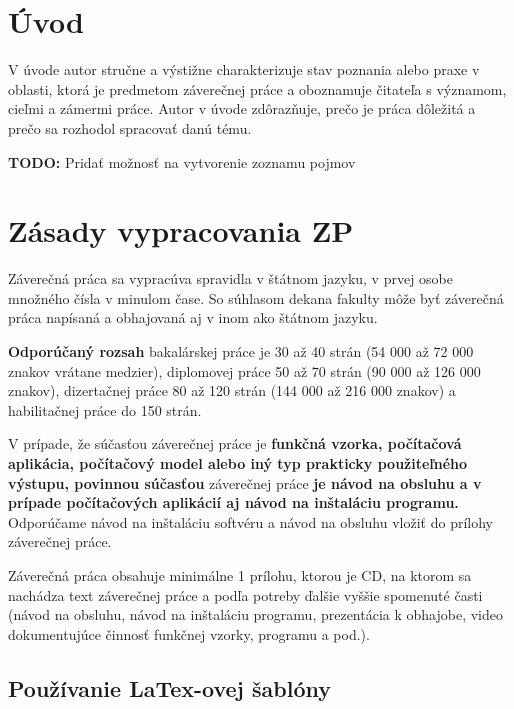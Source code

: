 \documentclass[12]{article}
\begin{document}
\unizafrontmatter %

\section*{Úvod} %
V úvode autor stručne a výstižne charakterizuje stav poznania alebo praxe v oblasti, ktorá je predmetom záverečnej práce a oboznamuje čitateľa s významom, cieľmi a zámermi práce. Autor v úvode zdôrazňuje, prečo je práca dôležitá a prečo sa rozhodol spracovať danú tému.

\textbf{TODO:} Pridať možnosť na vytvorenie zoznamu pojmov

\newpage
\section{Zásady vypracovania ZP}
Záverečná práca sa vypracúva spravidla v štátnom jazyku, v prvej osobe množného čísla v minulom čase. So súhlasom dekana fakulty môže byť záverečná práca napísaná a obhajovaná aj v inom ako štátnom jazyku.

\textbf{Odporúčaný rozsah} bakalárskej práce je 30 až 40 strán (54 000 až 72 000 znakov vrátane medzier), diplomovej práce 50 až 70 strán (90 000 až 126 000 znakov), dizertačnej práce 80 až 120 strán (144 000 až 216 000 znakov) a habilitačnej práce do 150 strán.

V prípade, že súčasťou záverečnej práce je \textbf{funkčná vzorka, počítačová aplikácia, počítačový model alebo iný typ prakticky použiteľného výstupu, povinnou súčasťou} záverečnej práce \textbf{je návod na obsluhu a v prípade počítačových aplikácií aj návod na inštaláciu programu.} Odporúčame návod na inštaláciu softvéru a návod na obsluhu vložiť do prílohy záverečnej práce.

Záverečná práca obsahuje minimálne 1 prílohu, ktorou je CD, na ktorom sa nachádza text záverečnej práce a podľa potreby ďalšie vyššie spomenuté časti (návod na obsluhu, návod na inštaláciu programu, prezentácia k obhajobe, video dokumentujúce činnosť funkčnej vzorky, programu a pod.).    

\subsection{Používanie LaTex-ovej šablóny}
\end{document}
